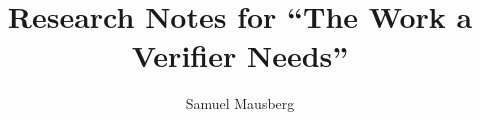 \documentclass[10pt]{article}
\title{Research Notes for ``The Work a Verifier Needs''}
\author{Samuel Mausberg}
\date{\builddate}
\begin{document}
\maketitle
\tableofcontents












{\raggedright


}
\end{document}
